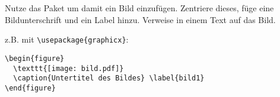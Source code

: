 
\item Nutze das Paket  um damit ein Bild einzufügen. Zentriere dieses, füge eine Bildunterschrift und ein Label hinzu. 
Verweise in einem Text auf das Bild.
\begin{loesung}
z.B. mit \verb|\usepackage{graphicx}|:
\begin{verbatim}
\begin{figure}
  \texttt{[image: bild.pdf]}
  \caption{Untertitel des Bildes} \label{bild1}
\end{figure}
\end{verbatim}
\end{loesung}
